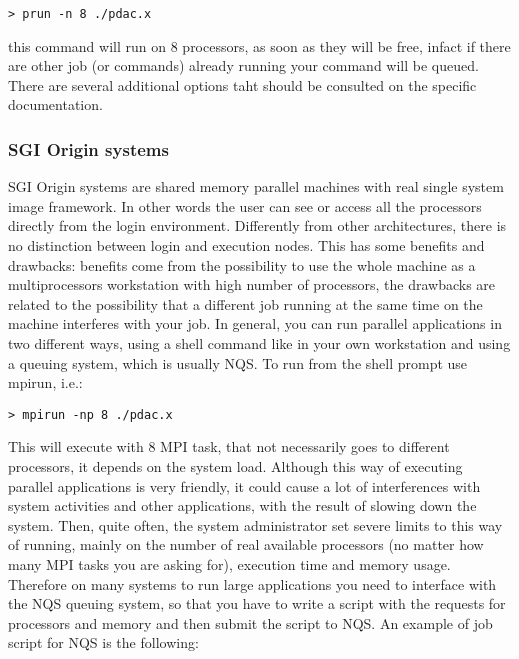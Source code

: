 \begin{verbatim}
> prun -n 8 ./pdac.x
\end{verbatim}

this command will run  on 8 processors, as soon as they will
be free, infact if there are other job (or commands) already running
your command will be queued.
There are several additional options taht should be consulted on the specific 
documentation.

\subsubsection{SGI Origin systems}

SGI Origin systems are shared memory parallel machines with
real single system image framework. In other words the user
can see or access all the processors directly from the 
login environment. Differently from other architectures,
there is no distinction between login and execution nodes.
This has some benefits and drawbacks: benefits come from
the possibility to use the whole machine as a multiprocessors
workstation with high number of processors, the drawbacks
are related to the possibility that a different job running
at the same time on the machine interferes with your job.
In general, you can run parallel applications 
in two different ways, using a shell command like in your own
workstation and using a queuing system, which is usually NQS.
To run from the shell prompt use mpirun, i.e.: 

\begin{verbatim}
> mpirun -np 8 ./pdac.x
\end{verbatim}

This will execute  with 8 MPI task, that not necessarily
goes to different processors, it depends on the system load.
Although this way of executing parallel applications is very
friendly, it could cause a lot of interferences with system
activities and other applications, with the result of slowing
down the system. Then, quite often, the system administrator
set severe limits to this way of running, mainly on the number of
real available processors (no matter how many MPI tasks you are asking
for), execution time and memory usage.
Therefore on many systems to run large applications you need to 
interface with the NQS queuing system, so that
you have to write a script with the requests for processors and
memory and then submit the script to NQS.
An example of job script for NQS is the following: 

